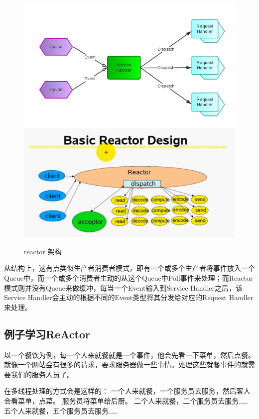 \documentclass[UTF8,a4paper,12pt]{ctexbook}
\begin{document}
			\begin{figure}[h]
				\centering
				\includegraphics[scale = 0.7]{Reactor.png}
				\includegraphics[scale = 0.7]{figures/reactor.png}
				\caption{reactor 架构}
			\end{figure}
	
		从结构上，这有点类似生产者消费者模式，即有一个或多个生产者将事件放入一个Queue中，而一个或多个消费者主动的从这个Queue中Poll事件来处理；而Reactor模式则并没有Queue来做缓冲，每当一个Event输入到Service Handler之后，该Service Handler会主动的根据不同的Event类型将其分发给对应的Request Handler来处理。
		
		\subsection{例子学习ReActor}
			以一个餐饮为例，每一个人来就餐就是一个事件，他会先看一下菜单，然后点餐。就像一个网站会有很多的请求，要求服务器做一些事情。处理这些就餐事件的就需要我们的服务人员了。
			
			在多线程处理的方式会是这样的：
			一个人来就餐，一个服务员去服务，然后客人会看菜单，点菜。 服务员将菜单给后厨。
			二个人来就餐，二个服务员去服务……
			五个人来就餐，五个服务员去服务……
			
\end{document}
